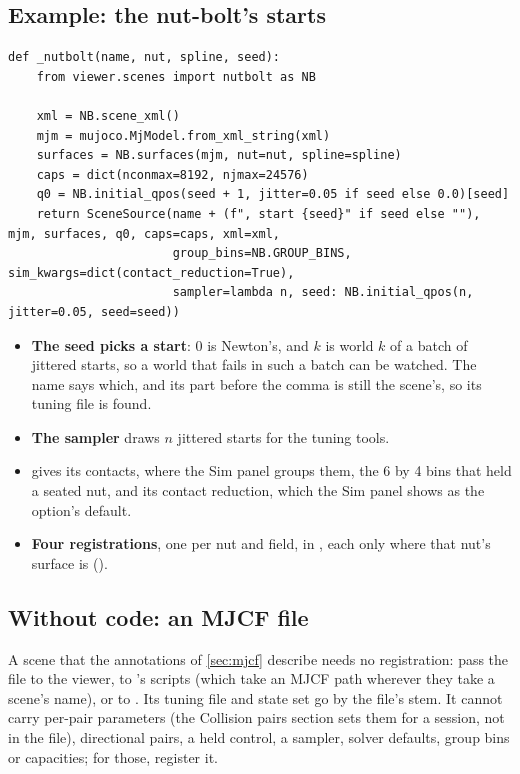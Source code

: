 \subsection{Example: the nut-bolt's starts}\label{sec:exnut}

\begin{lstlisting}
def _nutbolt(name, nut, spline, seed):
    from viewer.scenes import nutbolt as NB

    xml = NB.scene_xml()
    mjm = mujoco.MjModel.from_xml_string(xml)
    surfaces = NB.surfaces(mjm, nut=nut, spline=spline)
    caps = dict(nconmax=8192, njmax=24576)
    q0 = NB.initial_qpos(seed + 1, jitter=0.05 if seed else 0.0)[seed]
    return SceneSource(name + (f", start {seed}" if seed else ""), mjm, surfaces, q0, caps=caps, xml=xml,
                       group_bins=NB.GROUP_BINS, sim_kwargs=dict(contact_reduction=True),
                       sampler=lambda n, seed: NB.initial_qpos(n, jitter=0.05, seed=seed))
\end{lstlisting}

\begin{itemize}
\item \textbf{The seed picks a start}: 0 is Newton's, and $k$ is world $k$ of a batch of jittered starts, so a world that fails in such a batch can be watched. The name says which, and its part before the comma is still the scene's, so its tuning file is found.
\item \textbf{The sampler} draws $n$ jittered starts for the tuning tools.
\item \textbf{} gives its contacts, where the Sim panel groups them, the 6 by 4 bins that held a seated nut, and \textbf{} its contact reduction, which the Sim panel shows as the option's default.
\item \textbf{Four registrations}, one per nut and field, in , each only where that nut's surface is ().
\end{itemize}

\subsection{Without code: an MJCF file}\label{sec:nocode}

A scene that the annotations of \cref{sec:mjcf} describe needs no registration: pass the file to the viewer, to 's scripts (which take an MJCF path wherever they take a scene's name), or to . Its tuning file and state set go by the file's stem. It cannot carry per-pair parameters (the Collision pairs section sets them for a session, not in the file), directional pairs, a held control, a sampler, solver defaults, group bins or capacities; for those, register it.

